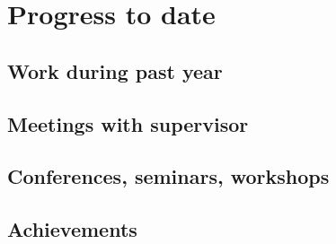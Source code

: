 \section{Progress to date}
  \subsection{Work during past year}
  \subsection{Meetings with supervisor}
  \subsection{Conferences, seminars, workshops}
  \subsection{Achievements}
